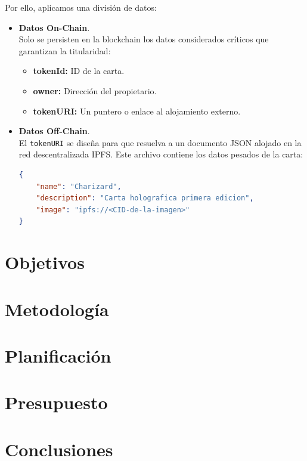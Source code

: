 Por ello, aplicamos una división de datos:
\begin{itemize}
    \item \textbf{Datos On-Chain}. \\ Solo se persisten en la blockchain los datos considerados críticos que garantizan la titularidad:
    \begin{itemize}
        \item \textbf{tokenId:} ID de la carta. %
        \item \textbf{owner:} Dirección del propietario.
        \item \textbf{tokenURI:} Un puntero o enlace al alojamiento externo.
    \end{itemize}

    \item \textbf{Datos Off-Chain}. \\ El \texttt{tokenURI} se diseña para que resuelva a un documento JSON alojado en la 
    red descentralizada IPFS. Este archivo contiene los datos pesados de la carta: %

    \begin{lstlisting}[language=json, caption=Ejemplo de tokenURI apuntando a IPFS]
{
    "name": "Charizard",
    "description": "Carta holografica primera edicion",
    "image": "ipfs://<CID-de-la-imagen>"
}
    \end{lstlisting}
\end{itemize}

\section{Objetivos}

\section{Metodología}

\section{Planificación}

\section{Presupuesto}

\section{Conclusiones}